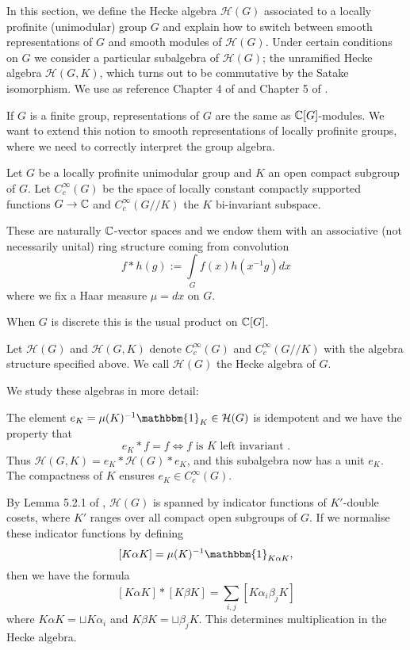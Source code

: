 In this section, we define the Hecke algebra $\mathcal H(G)$ associated to a locally profinite (unimodular) group $G$ and explain how to switch between smooth representations of $G$ and smooth modules of $\mathcal H(G)$. Under certain conditions on $G$ we consider a particular subalgebra of $\mathcal H(G)$; the unramified Hecke algebra $\mathcal H(G,K)$, which turns out to be commutative by the Satake isomorphism. We use as reference Chapter 4 of \cite{BH1} and Chapter 5 of \cite{GH1}.

If $G$ is a finite group, representations of $G$ are the same as $\mathbb{C}[G]$-modules. We want to extend this notion to smooth representations of locally profinite groups, where we need to correctly interpret the group algebra.

Let $G$ be a locally profinite unimodular group and $K$ an open compact subgroup of $G$. Let $C_c^\infty(G)$ be the space of locally constant compactly supported functions $G \to \mathbb{C}$ and $C_c^\infty(G//K)$ the $K$ bi-invariant subspace.

These are naturally $\mathbb{C}$-vector spaces and we endow them with an associative (not necessarily unital) ring structure coming from convolution
$$f * h(g) := \int\limits_G f(x)h(x^{-1}g)dx$$
where we fix a Haar measure $\mu = dx$ on $G$.

When $G$ is discrete this is the usual product on $\mathbb{C}[G]$. 

\begin{defn}
Let $\mathcal H(G)$ and $\mathcal H(G,K)$ denote $C_c^\infty(G)$ and $C_c^\infty(G//K)$ with the algebra structure specified above. We call $\mathcal H(G)$ the Hecke algebra of $G$.
\end{defn}

We study these algebras in more detail:

The element $e_K = \mu(K)^{-1} \mathbbm{1}_K \in \mathcal H(G)$ is idempotent and we have the property that 
$$e_K * f = f \Leftrightarrow f \text{ is $K$ left invariant }.$$
Thus $\mathcal H(G,K) = e_K * \mathcal H(G) * e_K$, and this subalgebra now has a unit $e_K$. The compactness of $K$ ensures $e_K \in C_c^\infty(G)$.

By Lemma 5.2.1 of \cite{GH1}, $\mathcal H(G)$ is spanned by indicator functions of $K'$-double cosets, where $K'$ ranges over all compact open subgroups of $G$. If we normalise these indicator functions by defining $$[K\alpha K] = \mu(K)^{-1} \mathbbm{1}_{K\alpha K},$$ then we have the formula
$$[K\alpha K] * [K\beta K] = \sum\limits_{i,j}[K\alpha_i \beta_j K]$$ where $K\alpha K = \sqcup K\alpha_i$ and $K\beta K = \sqcup \beta_j K$. This determines multiplication in the Hecke algebra.

